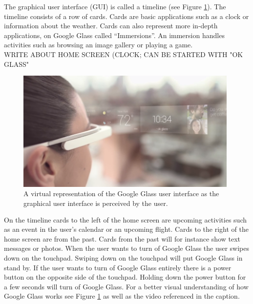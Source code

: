 The graphical user interface (GUI) is called a timeline (see Figure \ref{GoogleGlassUI}). The timeline consists of a row of cards. Cards are basic applications such as a clock or information about the weather. Cards can also represent more in-depth applications, on Google Glass called ``Immersions''. An immersion handles activities such as browsing an image gallery or playing a game.\\

WRITE ABOUT HOME SCREEN (CLOCK; CAN BE STARTED WITH "OK GLASS"

	\begin{figure}[ht!]
		\centering
		\includegraphics[width=110mm]{images/GoogleGlassUI}
		\caption{A virtual representation of the Google Glass user interface as the graphical user interface is perceived by the user.\cite{ImagesGoogleGlassUI}}
		\label{GoogleGlassUI}
	\end{figure}

On the timeline cards to the left of the home screen are upcoming activities such as an event in the user's calendar or an upcoming flight. Cards to the right of the home screen are from the past. Cards from the past will for instance show text messages or photos. When the user wants to turn of Google Glass the user swipes down on the touchpad. Swiping down on the touchpad will put Google Glass in stand by. If the user wants to turn of Google Glass entirely there is a power button on the opposite side of the touchpad. Holding down the power button for a few seconds will turn of Google Glass. For a better visual understanding of how Google Glass works see Figure \ref{GoogleGlassUI} as well as the video referenced in the caption.\\




